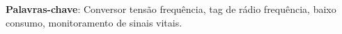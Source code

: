 \begin{resumo}



 \vspace{\onelineskip}
    
 \noindent
 \textbf{Palavras-chave}: Conversor tensão frequência, tag de rádio frequência, baixo consumo, monitoramento de sinais vitais.
\end{resumo}
